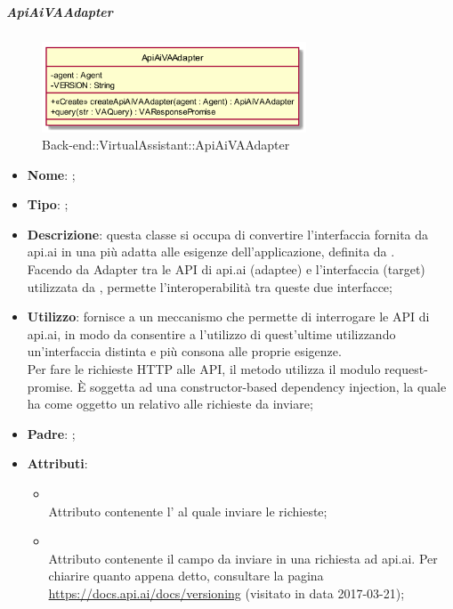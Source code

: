 \hypertarget{ApiAiVAAdapter_label}{\subparagraph{ApiAiVAAdapter}}
\begin{figure}[h]
	\centering
	\includegraphics[width=0.70\textwidth,height=\textheight,keepaspectratio]{images/ClassApiAiVAAdapter.png}
	\caption{Back-end::VirtualAssistant::ApiAiVAAdapter}
\end{figure}
\begin{itemize}
	\item \textbf{Nome}: ;
	\item \textbf{Tipo}: ;
	\item \textbf{Descrizione}: questa classe si occupa di convertire l'interfaccia fornita da api.ai in una più adatta alle esigenze dell'applicazione, definita da . \\
	Facendo da Adapter tra le API di api.ai (adaptee) e l'interfaccia  (target) utilizzata da , permette l'interoperabilità tra queste due interfacce;
	\item \textbf{Utilizzo}: fornisce a  un meccanismo che permette di interrogare le API di api.ai, in modo da consentire a  l'utilizzo di quest'ultime utilizzando un'interfaccia distinta e più consona alle proprie esigenze. \\ Per fare le richieste HTTP alle API, il metodo  utilizza il modulo request-promise.
	È soggetta ad una constructor-based dependency injection, la quale ha come oggetto un  relativo alle richieste da inviare;
	\item \textbf{Padre}: ;
	\item \textbf{Attributi}:
	\begin{itemize}
		\item[]  \\
		Attributo contenente l' al quale inviare le richieste;
		\item[]  \\
		Attributo contenente il campo  da inviare in una richiesta ad api.ai. Per chiarire quanto appena detto, consultare la pagina \url{https://docs.api.ai/docs/versioning}  (visitato in data 2017-03-21);

\end{itemize}
\end{itemize}
